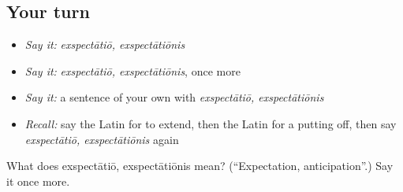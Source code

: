 \subsection*{Your turn}
\begin{itemize}
\raggedright
  \item \emph{Say it:} \emph{exspectātiō, exspectātiōnis}
  \item \emph{Say it:} \emph{exspectātiō, exspectātiōnis}, once more
  \item \emph{Say it:} a sentence of your own with \emph{exspectātiō, exspectātiōnis}
  \item \emph{Recall:} say the Latin for to extend, then the Latin for a putting off, then say \emph{exspectātiō, exspectātiōnis} again
\end{itemize}

\begin{tcolorbox}[breakable,colback=teal!4,colframe=teal!35!black,title={Before you move on}]
What does exspectātiō, exspectātiōnis mean? (\textquotedblleft{}Expectation, anticipation\textquotedblright{}.) Say it once more.
\end{tcolorbox}
